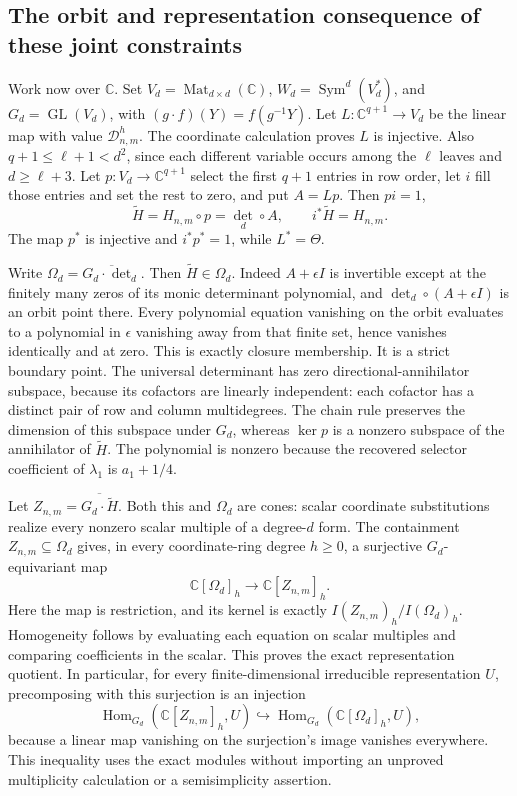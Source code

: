 \subsection{The orbit and representation consequence of these joint constraints}

Work now over $\mathbb C$. Set
$V_d=\operatorname{Mat}_{d\times d}(\mathbb C)$,
$W_d=\operatorname{Sym}^d(V_d^*)$, and
$G_d=\operatorname{GL}(V_d)$, with
$(g\cdot f)(Y)=f(g^{-1}Y)$.
Let $L:\mathbb C^{q+1}\to V_d$ be the linear map with value
$\mathcal D^h_{n,m}$. The coordinate calculation proves $L$ is
injective. Also $q+1\le\ell+1<d^2$, since each different variable
occurs among the $\ell$ leaves and $d\ge\ell+3$.
Let $p:V_d\to\mathbb C^{q+1}$ select the first $q+1$ entries
in row order, let $i$ fill those entries and set the rest to zero,
and put $A=Lp$. Then $pi=1$,
\[
 \widetilde H=H_{n,m}\circ p=\det_d\circ A,
 \qquad i^*\widetilde H=H_{n,m}.
\]
The map $p^*$ is injective and $i^*p^*=1$, while $L^*=\Theta$.

Write $\Omega_d=\overline{G_d\cdot\det_d}$. Then
$\widetilde H\in\Omega_d$. Indeed $A+\epsilon I$ is invertible
except at the finitely many zeros of its monic determinant polynomial,
and $\det_d\circ(A+\epsilon I)$ is an orbit point there.
Every polynomial equation vanishing on the orbit evaluates to a
polynomial in $\epsilon$ vanishing away from that finite set, hence
vanishes identically and at zero. This is exactly closure membership.
It is a strict boundary point. The universal determinant has zero
directional-annihilator subspace, because its cofactors are linearly
independent: each cofactor has a distinct pair of row and column
multidegrees. The chain rule preserves the dimension of this subspace
under $G_d$, whereas $\ker p$ is a nonzero subspace of the
annihilator of $\widetilde H$. The polynomial is nonzero because
the recovered selector coefficient of $\lambda_1$ is $a_1+1/4$.

Let $Z_{n,m}=\overline{G_d\cdot\widetilde H}$. Both this and
$\Omega_d$ are cones: scalar coordinate substitutions realize every
nonzero scalar multiple of a degree-$d$ form. The containment
$Z_{n,m}\subseteq\Omega_d$ gives, in every coordinate-ring degree
$h\ge0$, a surjective $G_d$-equivariant map
\[
 \mathbb C[\Omega_d]_h\longrightarrow\mathbb C[Z_{n,m}]_h.
\]
Here the map is restriction, and its kernel is exactly
$I(Z_{n,m})_h/I(\Omega_d)_h$. Homogeneity follows by evaluating
each equation on scalar multiples and comparing coefficients in the
scalar. This proves the exact representation quotient. In particular,
for every finite-dimensional irreducible representation $U$, precomposing
with this surjection is an injection
\[
 \operatorname{Hom}_{G_d}(\mathbb C[Z_{n,m}]_h,U)
 \hookrightarrow
 \operatorname{Hom}_{G_d}(\mathbb C[\Omega_d]_h,U),
\]
because a linear map vanishing on the surjection's image vanishes
everywhere. This inequality uses the exact modules without importing
an unproved multiplicity calculation or a semisimplicity assertion.

